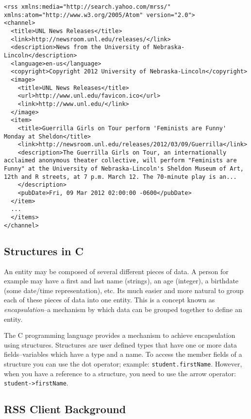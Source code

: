\documentclass[12pt]{scrartcl}
\begin{document}
\begin{verbatim}
<rss xmlns:media="http://search.yahoo.com/mrss/" xmlns:atom="http://www.w3.org/2005/Atom" version="2.0">
<channel>
  <title>UNL News Releases</title>
  <link>http://newsroom.unl.edu/releases/</link>
  <description>News from the University of Nebraska-Lincoln</description>
  <language>en-us</language>
  <copyright>Copyright 2012 University of Nebraska-Lincoln</copyright>
  <image>
    <title>UNL News Releases</title>
    <url>http://www.unl.edu/favicon.ico</url>
    <link>http://www.unl.edu/</link>
  </image>
  <item>
    <title>Guerrilla Girls on Tour perform 'Feminists are Funny' Monday at Sheldon</title>
    <link>http://newsroom.unl.edu/releases/2012/03/09/Guerrilla</link>
    <description>The Guerrilla Girls on Tour, an internationally acclaimed anonymous theater collective, will perform "Feminists are Funny" at the University of Nebraska-Lincoln's Sheldon Museum of Art, 12th and R streets, at 7 p.m. March 12. The 70-minute play is an...
    </description>
    <pubDate>Fri, 09 Mar 2012 02:00:00 -0600</pubDate>
  </item>
  ...
  </items>
</channel>
\end{verbatim}

\subsection*{Structures in C}

An entity may be composed of several different pieces of data.  
A person for example may have a first and last name (strings), 
an age (integer), a birthdate (some date/time representation), 
etc.  Its much easier and more natural to group each of these 
pieces of data into one entity.  This is a concept known as 
\emph{encapsulation}--a mechanism by which data can be 
grouped together to define an entity.

The C programming language provides a mechanism to achieve 
encapsulation using structures.  Structures are user defined types 
that have one or more data fields--variables which have a type 
and a name.  To access the member fields of a structure you can 
use the dot operator; example: \texttt{student.firstName}.  
However, when you have a reference to a structure, you need to 
use the arrow operator: \texttt{student->firstName}.

\subsection*{RSS Client Background}
\end{document}
